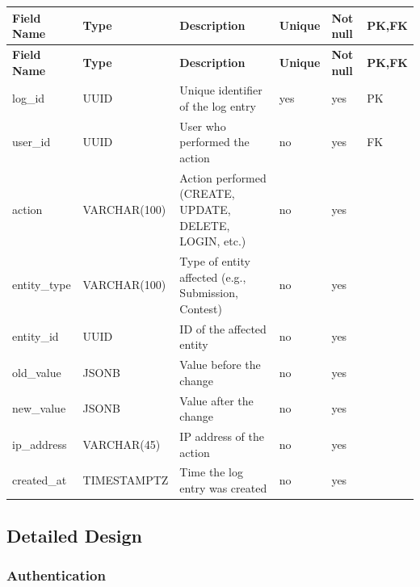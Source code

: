 \vspace{0.5em}
\renewcommand{\arraystretch}{1.15}
\setlength{\tabcolsep}{4pt}
\small
\begin{longtable}{|>{\raggedright\arraybackslash}p{}|>{\raggedright\arraybackslash}p{}|>{\raggedright\arraybackslash}p{}|>{\centering\arraybackslash}p{}|>{\centering\arraybackslash}p{}|>{\centering\arraybackslash}p{}|}
\hline
\textbf{Field Name} & \textbf{Type} & \textbf{Description} & \textbf{Unique} & \textbf{Not null} & \textbf{PK,FK} \\
\hline
\endfirsthead
\textbf{Field Name} & \textbf{Type} & \textbf{Description} & \textbf{Unique} & \textbf{Not null} & \textbf{PK,FK} \\
\hline
\endhead
log\_id & UUID & Unique identifier of the log entry & yes & yes & PK \\
\hline
user\_id & UUID & User who performed the action & no & yes & FK \\
\hline
action & VARCHAR(100) & Action performed (CREATE, UPDATE, DELETE, LOGIN, etc.) & no & yes & \\
\hline
entity\_type & VARCHAR(100) & Type of entity affected (e.g., Submission, Contest) & no & yes & \\
\hline
entity\_id & UUID & ID of the affected entity & no & yes & \\
\hline
old\_value & JSONB & Value before the change & no & yes & \\
\hline
new\_value & JSONB & Value after the change & no & yes & \\
\hline
ip\_address & VARCHAR(45) & IP address of the action & no & yes & \\
\hline
created\_at & TIMESTAMPTZ & Time the log entry was created & no & yes & \\
\hline
\end{longtable}

\vspace{1em}
\subsection{Detailed Design}
\label{subsec:detailed-design}

\vspace{0.6em}
\subsubsection{Authentication}
\label{subsubsec:design-authentication}

